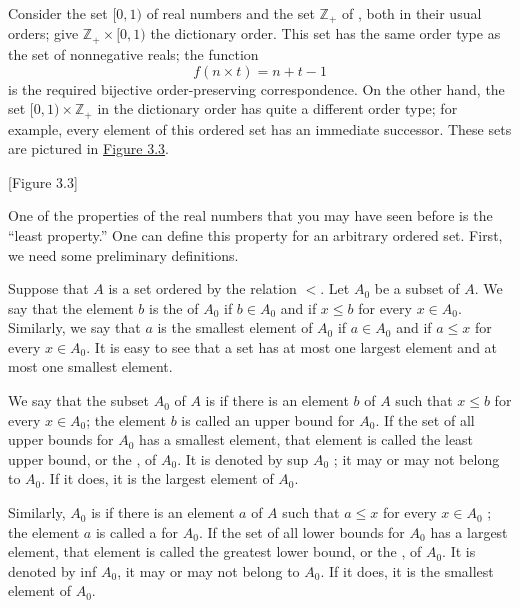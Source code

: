 \begin{centeredblock}
 \begin{example}
\label{ex:\thesection.\theexample}
 Consider the set \(\lbrack 0,1)\) of real numbers and the set \(\mathbb{Z}_{+}\) of , both in their usual orders; give \(\mathbb{Z}_{+} \times \lbrack 0,1)\) the dictionary order. This set has the same order type as the set of nonnegative reals; the function
 \[
 f({n \times t}) = n + t - 1
 \]
 is the required bijective order-preserving correspondence. On the other hand, the set \([0,1) \times {\mathbb{Z}}_{+}\) in the dictionary order has quite a different order type; for example, every element of this ordered set has an immediate successor. These sets are pictured in \hyperref[fig:3.3]{Figure 3.3}.
 \end{example}
\end{centeredblock}

[Figure 3.3]

One of the properties of the real numbers that you may have 
seen before is the ``least  property.''
One can define this property for an arbitrary ordered set. 
First, we need some preliminary definitions.

Suppose that \(A\) is a set ordered by the relation \(<\). 
Let \(A_{0}\) be a subset of \(A\). We say that the element \(b\) 
is the  of \(A_{0}\) if \(b \in {A}_{0}\) and 
if \(x \leq b\) for every \(x \in {A}_{0}\). 
Similarly, we say that \(a\) is the smallest element of \(A_{0}\) 
if \(a \in {A}_{0}\) and if \(a \leq x\) for every \(x \in {A}_{0}\). 
It is easy to see that a set has at most one largest element and at most 
one smallest element.

We say that the subset \(A_{0}\) of \(A\) is  if there is an 
element \(b\) of \(A\) such that \(x \leq b\) for every \(x \in {A}_{0}\); 
the element \(b\) is called an upper bound for \(A_{0}\). 
If the set of all upper bounds for \(A_{0}\) has a smallest element, 
that element is called the least upper bound, or the , of \(A_{0}\). 
It is denoted by sup \(A_{0}\) ; it may or may not belong to \(A_{0}\). 
If it does, it is the largest element of \(A_{0}\).

Similarly, \(A_{0}\) is  if there is an element \(a\) of \(A\) such that 
\(a \leq x\) for every \(x \in {A}_{0}\) ; the element \(a\) is called 
a  for \(A_{0}\). If the set of all lower bounds for 
\(A_{0}\) has a largest element, that element is called the greatest 
lower bound, or the , of \(A_{0}\). It is denoted by inf \(A_{0}\), 
it may or may not belong to \(A_{0}\). If it does, it is the smallest 
element of \(A_{0}\).

